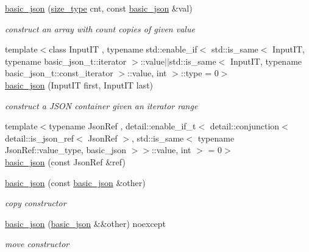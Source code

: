 \begin{DoxyCompactItemize}
\hyperlink{classnlohmann_1_1basic__json_afbccea367512a87b5d76e2bd92c5cc85}{basic\+\_\+json} (\hyperlink{classnlohmann_1_1basic__json_a3ada29bca70b4965f6fd37ec1c8f85f7}{size\+\_\+type} cnt, const \hyperlink{classnlohmann_1_1basic__json}{basic\+\_\+json} \&val)
\begin{DoxyCompactList}\small\item\em construct an array with count copies of given value \end{DoxyCompactList}\item 
{\footnotesize template$<$class Input\+IT , typename std\+::enable\+\_\+if$<$ std\+::is\+\_\+same$<$ Input\+I\+T, typename basic\+\_\+json\+\_\+t\+::iterator $>$\+::value$\vert$$\vert$std\+::is\+\_\+same$<$ Input\+I\+T, typename basic\+\_\+json\+\_\+t\+::const\+\_\+iterator $>$\+::value, int $>$\+::type  = 0$>$ }\\\hyperlink{classnlohmann_1_1basic__json_a23e540f473d32f1cf5d3243ea3ad495e}{basic\+\_\+json} (Input\+IT first, Input\+IT last)
\begin{DoxyCompactList}\small\item\em construct a J\+S\+ON container given an iterator range \end{DoxyCompactList}\item 
{\footnotesize template$<$typename Json\+Ref , detail\+::enable\+\_\+if\+\_\+t$<$ detail\+::conjunction$<$ detail\+::is\+\_\+json\+\_\+ref$<$ Json\+Ref $>$, std\+::is\+\_\+same$<$ typename Json\+Ref\+::value\+\_\+type, basic\+\_\+json $>$$>$\+::value, int $>$  = 0$>$ }\\\hyperlink{classnlohmann_1_1basic__json_a28524e9c443076ea6dccff8e391354ed}{basic\+\_\+json} (const Json\+Ref \&ref)
\item 
\hyperlink{classnlohmann_1_1basic__json_a603be713183ad63dd8c9e1052c606004}{basic\+\_\+json} (const \hyperlink{classnlohmann_1_1basic__json}{basic\+\_\+json} \&other)
\begin{DoxyCompactList}\small\item\em copy constructor \end{DoxyCompactList}\item 
\hyperlink{classnlohmann_1_1basic__json_a642afd9d8886e0dedfc0d5cee2baf57f}{basic\+\_\+json} (\hyperlink{classnlohmann_1_1basic__json}{basic\+\_\+json} \&\&other) noexcept
\begin{DoxyCompactList}\small\item\em move constructor \end{DoxyCompactList}\item 

\end{DoxyCompactItemize}
